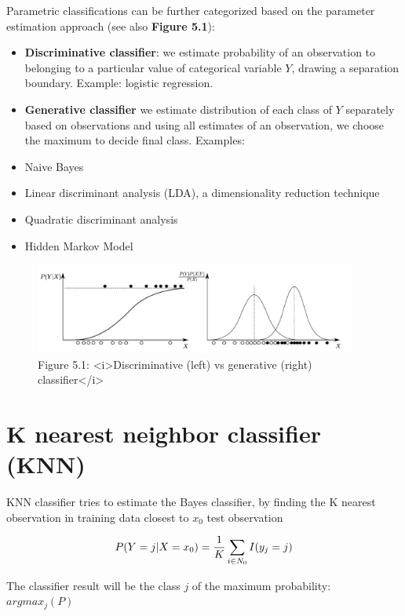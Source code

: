 Parametric classifications can be further categorized based on the parameter estimation approach (see also \textbf{Figure 5.1}):
\begin{itemize}
    \item \textbf{Discriminative classifier}: we estimate probability of an observation to belonging to a particular value of categorical variable \(Y\), drawing a separation boundary. Example: logistic regression.
    \item \textbf{Generative classifier} we estimate distribution of each class of \(Y\) separately based on observations and using all estimates of an observation, we choose the maximum to decide final class. Examples:
    \item Naive Bayes
    \item Linear discriminant analysis (LDA), a dimensionality reduction technique
    \item Quadratic discriminant analysis
    \item Hidden Markov Model
\end{itemize}


\begin{figure}[htbp]
    \begin{center}
        \includegraphics[width=300pt]{../img/05-discriminative-generative.png}
        \caption{Figure 5.1: <i>Discriminative (left) vs generative (right) classifier</i>}
    \end{center}
\end{figure}


\section{K nearest neighbor classifier (KNN)}

KNN classifier tries to estimate the Bayes classifier, by finding the K nearest observation in training data closest to \(x_0\) test observation

\[P(Y = j | X = x_0) = {1 \over K} \sum_{i \in N_0}I(y_j = j)\]

The classifier result will be the class \(j\) of the maximum probability: \(argmax_j(P)\)

